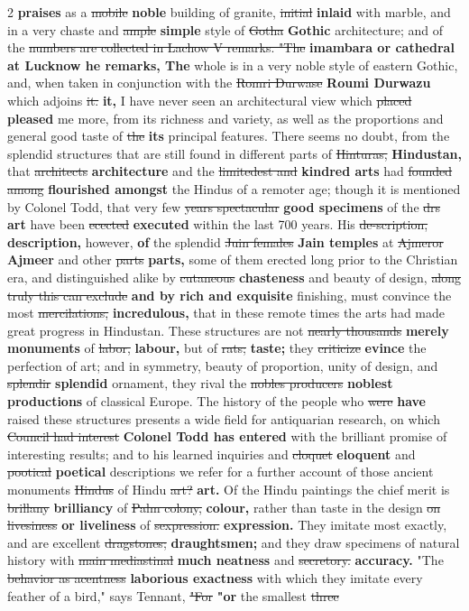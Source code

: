 \documentclass[10pt]{article}
\begin{document}
\begin{multicols}{2}
\textbf{praises} as a \sout{mobile} \textbf{noble} building of granite, \sout{initial} \textbf{inlaid} with marble, and in a very chaste and \sout{ample} \textbf{simple} style of \sout{Gotha} \textbf{Gothic} architecture; and of the \sout{numbers are collected in Lachow V remarks. "The} \textbf{imambara or cathedral at Lucknow he remarks, The} whole is in a very noble style of eastern Gothic, and, when taken in conjunction with the \sout{Romri Durwase} \textbf{Roumi Durwazu} which adjoins \sout{it.} \textbf{it,} I have never seen an architectural view which \sout{placed} \textbf{pleased} me more, from its richness and variety, as well as the proportions and general good taste of \sout{the} \textbf{its} principal features. There seems no doubt, from the splendid structures that are still found in different parts of \sout{Hinturas,} \textbf{Hindustan,} that \sout{architects} \textbf{architecture} and the \sout{limitedest and} \textbf{kindred arts} had \sout{founded among} \textbf{flourished amongst} the Hindus of a remoter age; though it is mentioned by Colonel Todd, that very few \sout{years spectacular} \textbf{good specimens} of the \sout{drs} \textbf{art} have been \sout{ecected} \textbf{executed} within the last 700 years. His \sout{de-scription,} \textbf{description,} however, \textbf{of} the splendid \sout{Juin females} \textbf{Jain temples} at \sout{Ajmeror} \textbf{Ajmeer} and other \sout{parts} \textbf{parts,} some of them erected long prior to the Christian era, and distinguished alike by \sout{cutaneous} \textbf{chasteness} and beauty of design, \sout{along truly this can exclude} \textbf{and by rich and exquisite} finishing, must convince the most \sout{mercilations,} \textbf{incredulous,} that in these remote times the arts had made great progress in Hindustan. These structures are not \sout{nearly thousands} \textbf{merely monuments} of \sout{labor,} \textbf{labour,} but of \sout{rats;} \textbf{taste;} they \sout{criticize} \textbf{evince} the perfection of art; and in symmetry, beauty of proportion, unity of design, and \sout{splendir} \textbf{splendid} ornament, they rival the \sout{nobles producers} \textbf{noblest productions} of classical Europe. The history of the people who \sout{were} \textbf{have} raised these structures presents a wide field for antiquarian research, on which \sout{Council had interest} \textbf{Colonel Todd has entered} with the brilliant promise of interesting results; and to his learned inquiries and \sout{cloquet} \textbf{eloquent} and \sout{pootical} \textbf{poetical} descriptions we refer for a further account of those ancient monuments \sout{Hindus} of Hindu \sout{art?} \textbf{art.} Of the Hindu paintings the chief merit is \sout{brillany} \textbf{brilliancy} of \sout{Palm colony,} \textbf{colour,} rather than taste in the design \sout{on livesiness} \textbf{or liveliness} of \sout{sexpression.} \textbf{expression.} They imitate most exactly, and are excellent \sout{dragstones;} \textbf{draughtsmen;} and they draw specimens of natural history with \sout{main mediastinal} \textbf{much neatness} and \sout{secretory.} \textbf{accuracy.} "The \sout{behavior as acentness} \textbf{laborious exactness} with which they imitate every feather of a bird," says Tennant, \sout{"For} \textbf{"or} the smallest \sout{three} 
\end{multicols}
\end{document}
